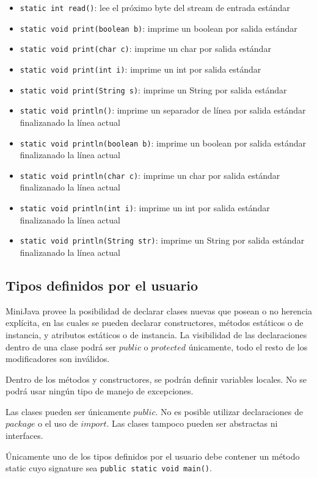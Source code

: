 \documentclass [a4paper,abstracton,titlepage]{scrartcl}
\begin{document}
\begin{itemize}
 \item \texttt{static int read()}: lee el próximo byte del stream de entrada estándar
 \item \texttt{static void print(boolean b)}: imprime un boolean por salida estándar
 \item \texttt{static void print(char c)}: imprime un char por salida estándar
 \item \texttt{static void print(int i)}: imprime un int por salida estándar
 \item \texttt{static void print(String s)}: imprime un String por salida estándar
 \item \texttt{static void println()}: imprime un separador de línea por salida estándar finalizanado la línea actual 
 \item \texttt{static void println(boolean b)}: imprime un boolean por salida estándar finalizanado la línea actual
 \item \texttt{static void println(char c)}: imprime un char por salida estándar finalizanado la línea actual
 \item \texttt{static void println(int i)}: imprime un int por salida estándar finalizanado la línea actual
 \item \texttt{static void println(String str)}: imprime un String por salida estándar finalizanado la línea actual
\end{itemize}

\subsection{Tipos definidos por el usuario}

MiniJava provee la posibilidad de declarar clases nuevas que posean o no herencia explícita, en las cuales se pueden declarar constructores, métodos estáticos o de instancia, y atributos estáticos o de instancia. La visibilidad de las declaraciones dentro de una clase podrá ser $public$ o $protected$ únicamente, todo el resto de los modificadores son inválidos.

Dentro de los métodos y constructores, se podrán definir variables locales. No se podrá usar ningún tipo de manejo de excepciones.

Las clases pueden ser únicamente $public$. No es posible utilizar declaraciones de $package$ o el uso de $import$. Las clases tampoco pueden ser abstractas ni interfaces.

Únicamente uno de los tipos definidos por el usuario debe contener un método static cuyo signature sea \texttt{public static void main()}.
\end{document}
